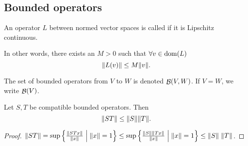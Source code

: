 \subsection{Bounded operators}
\begin{definition}
An operator $L$ between normed vector spaces is called  if it is Lipschitz continuous.

In other words, there exists an $M>0$ such that $\forall v\in \operatorname{dom}(L)$
\[ \lVert L(v)\rVert \leq M \lVert v\rVert. \]

The set of bounded operators from $V$ to $W$ is denoted $\mathop{\mathcal{B}}(V,W)$. If $V=W$, we write $\mathop{\mathcal{B}}(V)$.
\end{definition}

\begin{lemma}
Let $S,T$ be compatible bounded operators. Then
\[ \lVert ST\rVert \leq \lVert S\rVert\lVert T\rVert. \]
\end{lemma}
\begin{proof}
$\lVert ST\rVert = \sup\left\{ \frac{\lVert STx\rVert}{\lVert x\rVert} \;\middle|\; \lVert x\rVert=1 \right\} \leq \sup\left\{ \frac{\lVert S\rVert\lVert Tx\rVert}{\lVert x\rVert} \;\middle|\; \lVert x\rVert=1 \right\}\leq \lVert S\rVert\;\lVert T\rVert$.
\end{proof}

